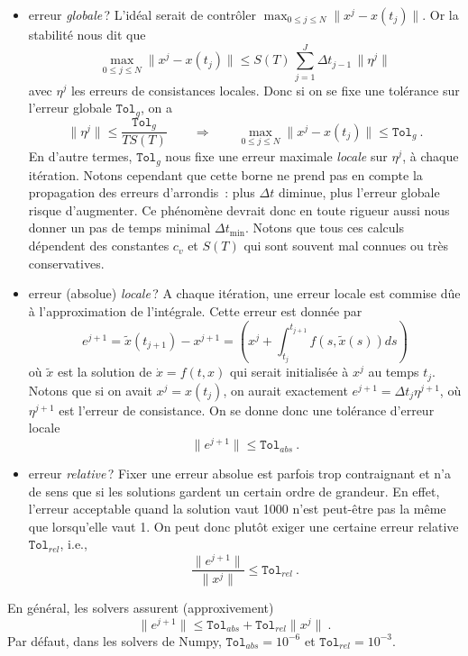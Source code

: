 \begin{itemize}
\item
  erreur \emph{globale}\,? L'idéal serait de contrôler
  \(\max_{0\leq j\leq N} \|x^j - x(t_j)\|\). Or la stabilité nous dit
  que \[
  \max_{0\leq j\leq N} \|x^j - x(t_j)\| \leq S(T) \,  \sum_{j = 1}^J {\Delta t}_{j-1}\, \|\eta^j\|
  \] avec \(\eta^j\) les erreurs de consistances locales. Donc si on se
  fixe une tolérance sur l'erreur globale \(\texttt{Tol}_g\), on a \[
  \|\eta^j\| \leq \frac{\texttt{Tol}_g}{TS(T)} \qquad \Longrightarrow \qquad \max_{0\leq j\leq N} \|x^j - x(t_j)\| \leq \texttt{Tol}_g \ .
  \] En d'autre termes, \(\texttt{Tol}_g\) nous fixe une erreur maximale
  \emph{locale} sur \(\eta^j\), à chaque itération. Notons cependant que
  cette borne ne prend pas en compte la propagation des erreurs
  d'arrondis~: plus \({\Delta t}\) diminue, plus l'erreur globale risque
  d'augmenter. Ce phénomène devrait donc en toute rigueur aussi nous
  donner un pas de temps minimal \({\Delta t}_{\min}\). Notons que tous
  ces calculs dépendent des constantes \(c_v\) et \(S(T)\) qui sont
  souvent mal connues ou très conservatives.
\item
  erreur (absolue) \emph{locale}\,? A chaque itération, une erreur
  locale est commise dûe à l'approximation de l'intégrale. Cette erreur
  est donnée par \[
  e^{j+1} = \tilde{x}(t_{j+1}) -x^{j+1} = \left(x^j + \int_{t_j}^{t_{j+1}} f(s,\tilde{x}(s))ds\right)
  \] où \(\tilde{x}\) est la solution de \(\dot{x}=f(t,x)\) qui serait
  initialisée à \(x^j\) au temps \(t_j\). Notons que si on avait
  \(x^j=x(t_j)\), on aurait exactement
  \(e^{j+1}={\Delta t}_j \eta^{j+1}\), où \(\eta^{j+1}\) est l'erreur de
  consistance. On se donne donc une tolérance d'erreur locale \[
  \|e^{j+1}\| \leq \texttt{Tol}_{abs} \ .
  \]
\item
  erreur \emph{relative}\,? Fixer une erreur absolue est parfois trop
  contraignant et n'a de sens que si les solutions gardent un certain
  ordre de grandeur. En effet, l'erreur acceptable quand la solution
  vaut 1000 n'est peut-être pas la même que lorsqu'elle vaut 1. On peut
  donc plutôt exiger une certaine erreur relative
  \(\texttt{Tol}_{rel}\), i.e., \[
  \frac{\|e^{j+1}\|}{\|x^j\|}\leq \texttt{Tol}_{rel} \ .
  \]
\end{itemize}

En général, les solvers assurent (approxivement) \[
\|e^{j+1}\| \leq \texttt{Tol}_{abs} + \texttt{Tol}_{rel} \|x^j\| \ .
\] Par défaut, dans les solvers de Numpy,
\(\texttt{Tol}_{abs} = 10^{-6}\) et \(\texttt{Tol}_{rel}= 10^{-3}\).

